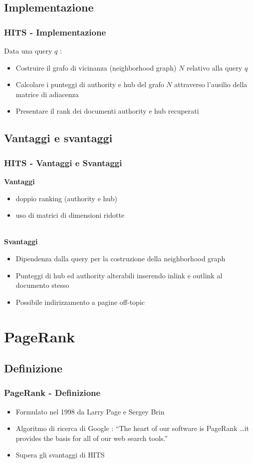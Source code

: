 \documentclass{beamer}
\begin{document}
\subsection{Implementazione}
\begin{frame}
	\frametitle{HITS - Implementazione}
	Data una query $q$ :
	\begin{itemize}
		\item Costruire il grafo di vicinanza (neighborhood graph) $N$ relativo alla query $q$
		\item Calcolare i punteggi di authority e hub del grafo $N$ attraverso l'ausilio della matrice di adiacenza
		\item Presentare il rank dei documenti authority e hub recuperati
	\end{itemize}
\end{frame}
\subsection{Vantaggi e svantaggi}
\begin{frame}
	\frametitle{HITS - Vantaggi e Svantaggi}
	\textbf{Vantaggi}
	\begin{itemize}
		\item doppio ranking (authority e hub)
		\item uso di matrici di dimensioni ridotte \\~\\
	\end{itemize}
	\textbf{Svantaggi}
	\begin{itemize}
		\item Dipendenza dalla query per la costruzione della neighborhood graph
		\item Punteggi di hub ed authority alterabili inserendo inlink e outlink al documento stesso
		\item Possibile indirizzamento a pagine off-topic
	\end{itemize}
\end{frame}

\section{PageRank}
\subsection{Definizione}
\begin{frame}
	\frametitle{PageRank - Definizione}
	\begin{itemize}
		\item Formulato nel 1998 da Larry Page e Sergey Brin
		\item Algoritmo di ricerca di Google : ``The heart of our software is PageRank \texttrademark\dots it provides the basis for all of our web search tools.''
		\item Supera gli svantaggi di HITS
	\end{itemize}
\end{frame}
\end{document}
